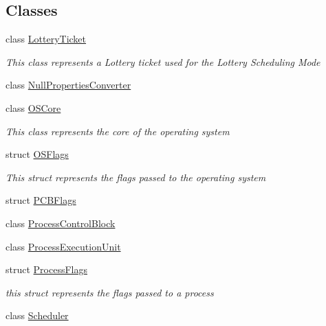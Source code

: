 \subsection*{Classes}
\begin{DoxyCompactItemize}
\item 
class \hyperlink{class_c_p_u___o_s___simulator_1_1_operating___system_1_1_lottery_ticket}{Lottery\+Ticket}
\begin{DoxyCompactList}\small\item\em This class represents a Lottery ticket used for the Lottery Scheduling Mode \end{DoxyCompactList}\item 
class \hyperlink{class_c_p_u___o_s___simulator_1_1_operating___system_1_1_null_properties_converter}{Null\+Properties\+Converter}
\item 
class \hyperlink{class_c_p_u___o_s___simulator_1_1_operating___system_1_1_o_s_core}{O\+S\+Core}
\begin{DoxyCompactList}\small\item\em This class represents the core of the operating system \end{DoxyCompactList}\item 
struct \hyperlink{struct_c_p_u___o_s___simulator_1_1_operating___system_1_1_o_s_flags}{O\+S\+Flags}
\begin{DoxyCompactList}\small\item\em This struct represents the flags passed to the operating system \end{DoxyCompactList}\item 
struct \hyperlink{struct_c_p_u___o_s___simulator_1_1_operating___system_1_1_p_c_b_flags}{P\+C\+B\+Flags}
\item 
class \hyperlink{class_c_p_u___o_s___simulator_1_1_operating___system_1_1_process_control_block}{Process\+Control\+Block}
\item 
class \hyperlink{class_c_p_u___o_s___simulator_1_1_operating___system_1_1_process_execution_unit}{Process\+Execution\+Unit}
\item 
struct \hyperlink{struct_c_p_u___o_s___simulator_1_1_operating___system_1_1_process_flags}{Process\+Flags}
\begin{DoxyCompactList}\small\item\em this struct represents the flags passed to a process \end{DoxyCompactList}\item 
class \hyperlink{class_c_p_u___o_s___simulator_1_1_operating___system_1_1_scheduler}{Scheduler}

\end{DoxyCompactItemize}
